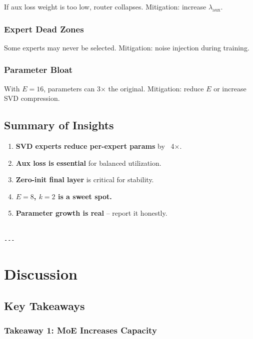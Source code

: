 If aux loss weight is too low, router collapses. Mitigation: increase 
$\lambda_\text{aux}$.

\subsubsection{Expert Dead Zones}

Some experts may never be selected. Mitigation: noise injection during 
training.

\subsubsection{Parameter Bloat}

With $E = 16$, parameters can 3$\times$ the original. Mitigation: reduce $E$ or 
increase SVD compression.

\subsection{Summary of Insights}

\begin{enumerate}
\item \textbf{SVD experts reduce per-expert params} by ~4$\times$.
\item \textbf{Aux loss is essential} for balanced utilization.
\item \textbf{Zero-init final layer} is critical for stability.
\item \textbf{$E = 8$, $k = 2$ is a sweet spot.}
\item \textbf{Parameter growth is real} -- report it honestly.
\end{enumerate}
\begin{lstlisting}

---
\end{lstlisting}

\section{Discussion}

\subsection{Key Takeaways}

\subsubsection{Takeaway 1: MoE Increases Capacity}

